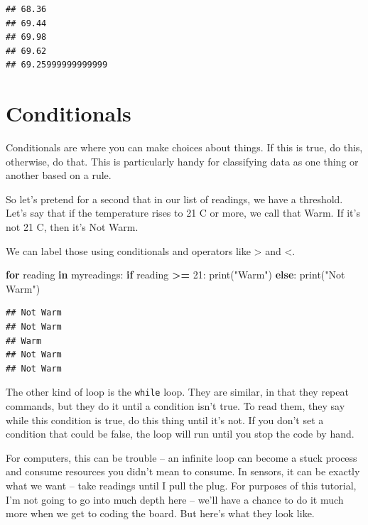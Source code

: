 \documentclass[
]{book}
\newenvironment{Shaded}{\begin{snugshade}}{\end{snugshade}}
\newcommand{\BuiltInTok}[1]{#1}
\newcommand{\ControlFlowTok}[1]{\textcolor[rgb]{0.13,0.29,0.53}{\textbf{#1}}}
\newcommand{\DecValTok}[1]{\textcolor[rgb]{0.00,0.00,0.81}{#1}}
\newcommand{\KeywordTok}[1]{\textcolor[rgb]{0.13,0.29,0.53}{\textbf{#1}}}
\newcommand{\NormalTok}[1]{#1}
\newcommand{\OperatorTok}[1]{\textcolor[rgb]{0.81,0.36,0.00}{\textbf{#1}}}
\newcommand{\StringTok}[1]{\textcolor[rgb]{0.31,0.60,0.02}{#1}}
\begin{document}
\begin{verbatim}
## 68.36
## 69.44
## 69.98
## 69.62
## 69.25999999999999
\end{verbatim}

\hypertarget{conditionals}{%
\section{Conditionals}\label{conditionals}}

Conditionals are where you can make choices about things. If this is true, do this, otherwise, do that. This is particularly handy for classifying data as one thing or another based on a rule.

So let's pretend for a second that in our list of readings, we have a threshold. Let's say that if the temperature rises to 21 C or more, we call that Warm. If it's not 21 C, then it's Not Warm.

We can label those using conditionals and operators like \textgreater{} and \textless.

\begin{Shaded}
\begin{Highlighting}[]
\ControlFlowTok{for}\NormalTok{ reading }\KeywordTok{in}\NormalTok{ myreadings:}
    \ControlFlowTok{if}\NormalTok{ reading }\OperatorTok{>=} \DecValTok{21}\NormalTok{:}
        \BuiltInTok{print}\NormalTok{(}\StringTok{"Warm"}\NormalTok{)}
    \ControlFlowTok{else}\NormalTok{:}
        \BuiltInTok{print}\NormalTok{(}\StringTok{"Not Warm"}\NormalTok{)}
\end{Highlighting}
\end{Shaded}

\begin{verbatim}
## Not Warm
## Not Warm
## Warm
## Not Warm
## Not Warm
\end{verbatim}

The other kind of loop is the \texttt{while} loop. They are similar, in that they repeat commands, but they do it until a condition isn't true. To read them, they say while this condition is true, do this thing until it's not. If you don't set a condition that could be false, the loop will run until you stop the code by hand.

For computers, this can be trouble -- an infinite loop can become a stuck process and consume resources you didn't mean to consume. In sensors, it can be exactly what we want -- take readings until I pull the plug. For purposes of this tutorial, I'm not going to go into much depth here -- we'll have a chance to do it much more when we get to coding the board. But here's what they look like.
\end{document}
